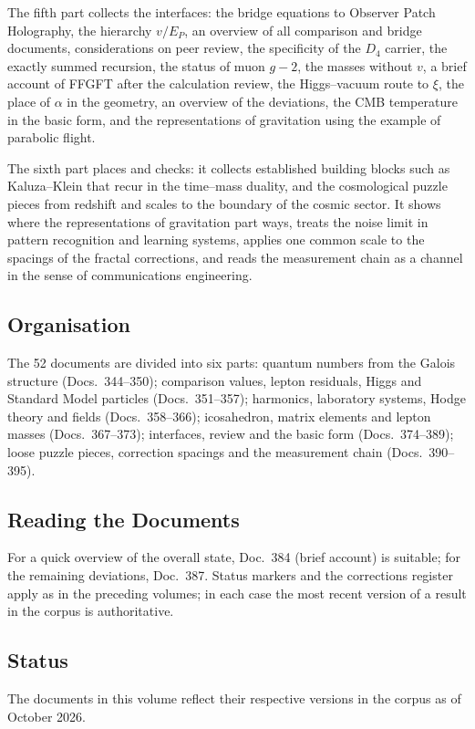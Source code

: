 The fifth part collects the interfaces: the bridge equations to Observer Patch
Holography, the hierarchy $v/E_P$, an overview of all comparison and bridge
documents, considerations on peer review, the specificity of the $D_4$
carrier, the exactly summed recursion, the status of muon $g-2$, the masses
without $v$, a brief account of FFGFT after the calculation review, the
Higgs--vacuum route to $\xi$, the place of $\alpha$ in the geometry, an
overview of the deviations, the CMB temperature in the basic form, and the
representations of gravitation using the example of parabolic flight.

The sixth part places and checks: it collects established building blocks
such as Kaluza--Klein that recur in the time--mass duality, and the
cosmological puzzle pieces from redshift and scales to the boundary of the
cosmic sector. It shows where the representations of gravitation part ways,
treats the noise limit in pattern recognition and learning systems, applies
one common scale to the spacings of the fractal corrections, and reads the
measurement chain as a channel in the sense of communications engineering.

\subsection*{Organisation}

The 52 documents are divided into six parts: quantum numbers from the Galois
structure (Docs.~344--350); comparison values, lepton residuals, Higgs and
Standard Model particles (Docs.~351--357); harmonics, laboratory systems,
Hodge theory and fields (Docs.~358--366); icosahedron, matrix elements and
lepton masses (Docs.~367--373); interfaces, review and the basic form
(Docs.~374--389); loose puzzle pieces, correction spacings and the
measurement chain (Docs.~390--395).

\subsection*{Reading the Documents}

For a quick overview of the overall state, Doc.~384 (brief account) is
suitable; for the remaining deviations, Doc.~387. Status markers and the
corrections register apply as in the preceding volumes; in each case the most
recent version of a result in the corpus is authoritative.

\subsection*{Status}

The documents in this volume reflect their respective versions in the corpus
as of October 2026.
